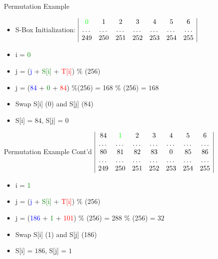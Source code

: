\documentclass[
	aspectratio=169,	%
	onlytextwidth,		%
	t,					%
	]{beamer}
\begin{document}
\begin{frame}{Permutation Example}
	\begin{itemize}
		\item S-Box Initialization:
		\medskip
		$\begin{array}{|ccccccc|}
		\textcolor{green}{0} & 1 & 2 & 3 & 4 & 5 & 6 \\
		\dots & \dots & \dots & \dots & \dots & \dots & \dots \\
		249 & 250 & 251 & 252 & 253 & 254 & 255 \\
		\end{array}$
		\item i = \textcolor{green}{0}
		\item j = (\textcolor{blue} {j} + \textcolor{green}{S[i]} + \textcolor{red}{T[i]}) $\%$ (256)
		\item j = (\textcolor{blue} {84} + \textcolor{green} {0} + \textcolor{red} {84}) $\%$(256) = 168 $\%$ (256) = $168$
		\item Swap S[i] (0) and S[j] (84)
		\item S[i] = $84$, S[j] = $0$
	\end{itemize}
\end{frame}

\begin{frame}{Permutation Example Cont'd}
	$\begin{array}{|ccccccc|}
		84 & \textcolor{green}{1} & 2 & 3 & 4 & 5 & 6 \\
		\dots & \dots & \dots & \dots & \dots & \dots & \dots \\
		80 & 81 & 82 & 83 & 0 & 85 & 86 \\
		\dots & \dots & \dots & \dots & \dots & \dots & \dots \\
		249 & 250 & 251 & 252 & 253 & 254 & 255 \\
	\end{array}$
	\begin{itemize}
		\item i = \textcolor{green}{1}
		\item j = (\textcolor{blue} {j} + \textcolor{green}{S[i]} + \textcolor{red}{T[i]}) $\%$ (256)
		\item j = (\textcolor{blue} {186} + \textcolor{green} {1} + \textcolor{red} {101}) $\%$ (256) = 288 $\%$ (256) = $32$
		\item Swap S[i] (1) and S[j] (186)
		\item S[i] = $186$, S[j] = $1$
	\end{itemize}
\end{frame}
\end{document}
